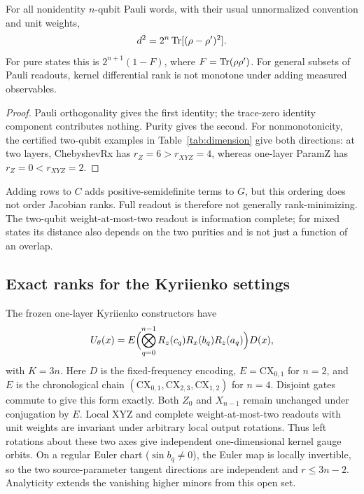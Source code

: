 \begin{proposition}
\label{prop:IC}
For all nonidentity $n$-qubit Pauli words, with their usual
unnormalized convention and unit weights,
\begin{equation}
 d^2=2^n\operatorname{Tr}[(\rho-\rho')^2].
\end{equation}
For pure states this is $2^{n+1}(1-F)$, where $F=\operatorname{Tr}(\rho\rho')$.
For general subsets of Pauli readouts, kernel differential rank is
not monotone under adding measured observables.
\end{proposition}
\begin{proof}
Pauli orthogonality gives the first identity; the trace-zero identity
component contributes nothing. Purity gives the second. For
nonmonotonicity, the certified two-qubit examples in
Table~\ref{tab:dimension} give both directions: at two layers,
ChebyshevRx has $r_Z=6>r_{XYZ}=4$, whereas one-layer ParamZ has
$r_Z=0<r_{XYZ}=2$.
\end{proof}
Adding rows to $C$ adds positive-semidefinite terms to $G$, but this
ordering does not order Jacobian ranks. Full readout is therefore not
generally rank-minimizing. The two-qubit weight-at-most-two readout
is information complete; for mixed states its distance also depends
on the two purities and is not just a function of an overlap.

\subsection{Exact ranks for the Kyriienko settings}
\label{sec:gramkyri}
The frozen one-layer Kyriienko constructors have
\begin{equation}
 U_\theta(x)=E\Bigl(\bigotimes_{q=0}^{n-1}
 R_z(c_q)R_x(b_q)R_z(a_q)\Bigr)D(x),\label{eq:kyriform}
\end{equation}
with $K=3n$. Here $D$ is the fixed-frequency encoding,
$E=\mathrm{CX}_{0,1}$ for $n=2$, and $E$ is the chronological
chain $(\mathrm{CX}_{0,1},\mathrm{CX}_{2,3},\mathrm{CX}_{1,2})$
for $n=4$. Disjoint gates commute to give this form exactly.
Both $Z_0$ and $X_{n-1}$ remain unchanged under conjugation by $E$.
Local XYZ and complete weight-at-most-two readouts with unit weights
are invariant under arbitrary local output rotations. Thus left
rotations about these two axes give independent one-dimensional
kernel gauge orbits. On a regular Euler chart ($\sin b_q\ne0$),
the Euler map is locally invertible, so the two source-parameter
tangent directions are independent and $r\le3n-2$.
Analyticity extends the vanishing higher minors from this open set.

